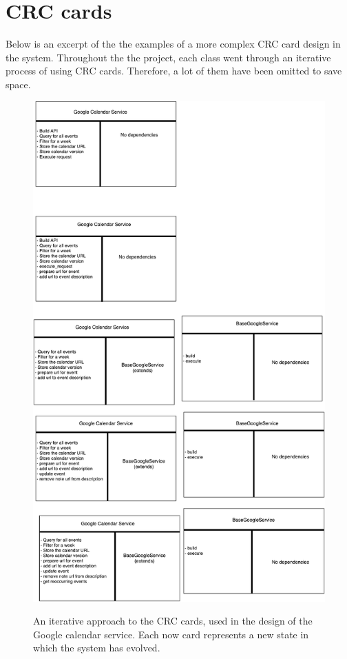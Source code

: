\section{CRC cards}
Below is an excerpt of the the examples of a more complex CRC card design in the system. Throughout the the project, each class went through an iterative process of using CRC cards. Therefore, a lot of them have been omitted to save space.

\begin{figure}[H]
  \centering
  \includegraphics{images/google_calendar_service.pdf}
  \label{fig:crc_card_google_calendar}
  \caption{An iterative approach to the CRC cards, used in the design of the Google calendar service. Each now card represents a new state in which the system has evolved.}
\end{figure}
